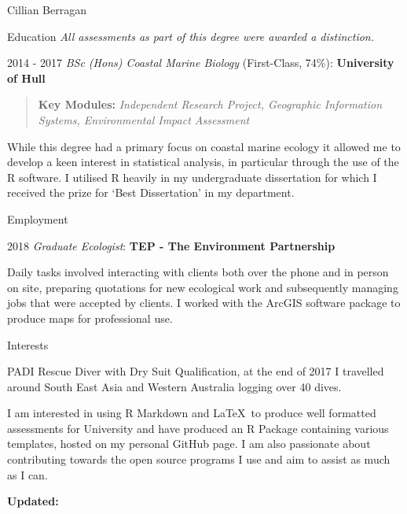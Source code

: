 \documentclass{scrartcl}
\begin{document}
\begin{cv}{Cillian Berragan}
\begin{cvlist}{Education}
    \textit{All assessments as part of this degree were awarded a distinction.}

    \item[2014 - 2017] \normalsize\textit{BSc (Hons) Coastal Marine Biology} (First-Class, 74\%): \textbf{University of Hull}

    \begin{quote}
        \small \textbf{Key Modules:} \textit{Independent Research Project, Geographic Information Systems, Environmental Impact Assessment}
    \end{quote}

    \small While this degree had a primary focus on coastal marine ecology it allowed me to develop a keen interest in statistical analysis, in particular through the use of the R software. I utilised R heavily in my undergraduate dissertation for which I received the prize for ‘Best Dissertation’ in my department.

\end{cvlist}

\begin{cvlist}{Employment}

    \item[2018] \normalsize\textit{Graduate Ecologist}: \textbf{TEP - The Environment Partnership}

    \small Daily tasks involved interacting with clients both over the phone and in person on site, preparing quotations for new ecological work and subsequently managing jobs that were accepted by clients. I worked with the ArcGIS software package to produce maps for professional use.

\end{cvlist}


\begin{cvlist}{Interests}
\item[]
PADI Rescue Diver with Dry Suit Qualification, at the end of 2017 I travelled around South East Asia and Western Australia logging over 40 dives.

I am interested in using R Markdown and \LaTeX\ to produce well formatted assessments for University and have produced an R Package containing various templates, hosted on my personal GitHub page. I am also passionate about contributing towards the open source programs I use and aim to assist as much as I can.


\end{cvlist}

\vfill

\small \textbf{Updated:} \end{cv}
\end{document}

